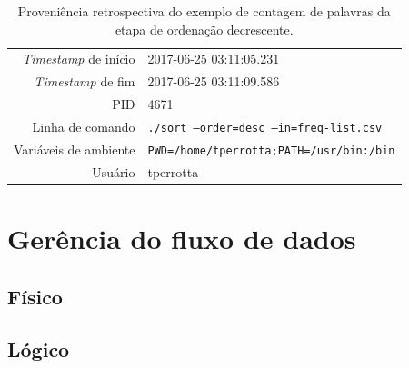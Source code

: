 \begin{table}[ht]
    \centering
    \begin{tabular}{r|l}
        \hline
        \textit{Timestamp} de início & 2017-06-25 03:11:05.231                         \\
        \textit{Timestamp} de fim    & 2017-06-25 03:11:09.586                         \\
        PID                          & 4671                                            \\
        Linha de comando             & \texttt{./sort --order=desc --in=freq-list.csv} \\
        Variáveis de ambiente        & \texttt{PWD=/home/tperrotta;PATH=/usr/bin:/bin} \\
        Usuário                      & tperrotta                                       \\
        \hline
    \end{tabular}
    \caption[Proveniência retrospectiva do exemplo de contagem de palavras]{Proveniência retrospectiva do exemplo de contagem de palavras da etapa de ordenação decrescente.}%
    \label{tab:word-count-retrospective}
\end{table}

\section{Gerência do fluxo de dados}
\subsection{Físico}
\subsection{Lógico}

